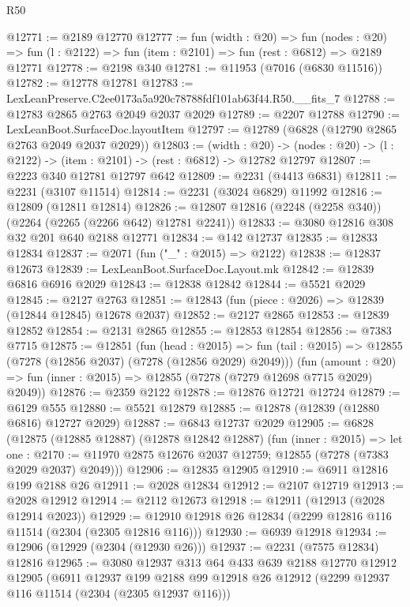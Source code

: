 \begin{lexlean}{R50}
\begin{coremodule}
@12771 := @2189 @12770
@12777 := fun (width : @20) =>
  fun (nodes : @20) => fun (l : @2122) => fun (item : @2101) => fun (rest : @6812) => @2189 @12771
@12778 := @2198 @340
@12781 := @11953 (@7016 (@6830 @11516))
@12782 := @12778 @12781
@12783 := LexLeanPreserve.C2ee0173a5a920c78788fdf101ab63f44.R50.__fits_7
@12788 := @12783 @2865 @2763 @2049 @2037 @2029
@12789 := @2207 @12788
@12790 := LexLeanBoot.SurfaceDoc.layoutItem
@12797 := @12789 (@6828 (@12790 @2865 @2763 @2049 @2037 @2029))
@12803 := (width : @20) ->
  (nodes : @20) -> (l : @2122) -> (item : @2101) -> (rest : @6812) -> @12782 @12797
@12807 := @2223 @340 @12781 @12797 @642
@12809 := @2231 (@4413 @6831)
@12811 := @2231 (@3107 @11514)
@12814 := @2231 (@3024 @6829) @11992
@12816 := @12809 (@12811 @12814)
@12826 := @12807 @12816 (@2248 (@2258 @340)) (@2264 (@2265 (@2266 @642) @12781 @2241))
@12833 := @3080 @12816 @308 @32 @201 @640 @2188 @12771
@12834 := @142 @12737
@12835 := @12833 @12834
@12837 := @2071 (fun ("_" : @2015) => @2122)
@12838 := @12837 @12673
@12839 := LexLeanBoot.SurfaceDoc.Layout.mk
@12842 := @12839 @6816 @6916 @2029
@12843 := @12838 @12842
@12844 := @5521 @2029
@12845 := @2127 @2763
@12851 := @12843 (fun (piece : @2026) => @12839 (@12844 @12845) @12678 @2037)
@12852 := @2127 @2865
@12853 := @12839 @12852
@12854 := @2131 @2865
@12855 := @12853 @12854
@12856 := @7383 @7715
@12875 := @12851
    (fun (head : @2015) =>
    fun (tail : @2015) => @12855 (@7278 (@12856 @2037) (@7278 (@12856 @2029) @2049)))
    (fun (amount : @20) => fun (inner : @2015) => @12855 (@7278 (@7279 @12698 @7715 @2029) @2049))
@12876 := @2359 @2122
@12878 := @12876 @12721 @12724
@12879 := @6129 @555
@12880 := @5521 @12879
@12885 := @12878 (@12839 (@12880 @6816) @12727 @2029)
@12887 := @6843 @12737 @2029
@12905 := @6828
    (@12875
      (@12885 @12887)
      (@12878 @12842 @12887)
      (fun (inner : @2015) =>
      let one : @2170 := @11970 @2875 @12676 @2037 @12759;
      @12855 (@7278 (@7383 @2029 @2037) @2049)))
@12906 := @12835 @12905
@12910 := @6911 @12816 @199 @2188 @26
@12911 := @2028 @12834
@12912 := @2107 @12719
@12913 := @2028 @12912
@12914 := @2112 @12673
@12918 := @12911 (@12913 (@2028 @12914 @2023))
@12929 := @12910 @12918 @26 @12834 (@2299 @12816 @116 @11514 (@2304 (@2305 @12816 @116)))
@12930 := @6939 @12918
@12934 := @12906 (@12929 (@2304 (@12930 @26)))
@12937 := @2231 (@7575 @12834) @12816
@12965 := @3080
    @12937
    @313
    @64
    @433
    @639
    @2188
    @12770
    @12912
    @12905
    (@6911
      @12937
      @199
      @2188
      @99
      @12918
      @26
      @12912
      (@2299 @12937 @116 @11514 (@2304 (@2305 @12937 @116)))

\end{coremodule}
\end{lexlean}
